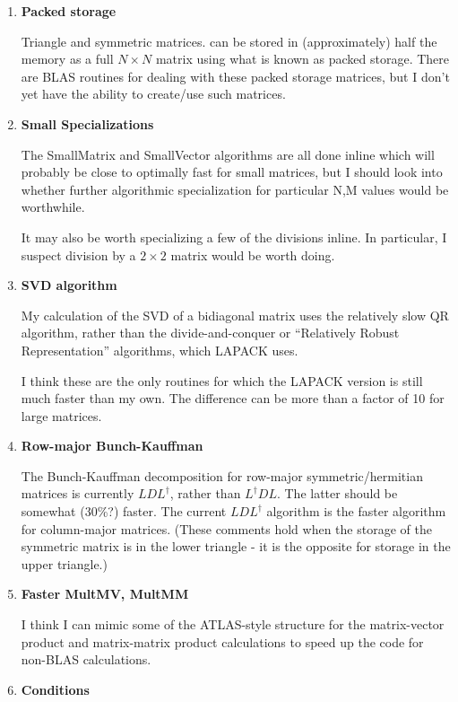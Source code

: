 \documentclass[twoside,letterpaper,11pt]{article}
\begin{document}
\begin{enumerate}
\item
\textbf{Packed storage}

Triangle and symmetric matrices. can be stored in (approximately) half the 
memory as a full $N \times N$ matrix using what is known as packed storage.  
There are BLAS routines for dealing with
these packed storage matrices, but I don't yet have the ability to 
create/use such matrices.

\item
\textbf{Small Specializations}

The SmallMatrix and SmallVector algorithms are all done inline which will
probably be close to optimally fast for small matrices, but I should look into
whether further algorithmic specialization for particular N,M values
would be worthwhile.

It may also be worth specializing a few of the divisions inline.  In particular,
I suspect division by a $2 \times 2$ matrix would be worth doing.

\item
\textbf{SVD algorithm}

My calculation of the 
SVD of a bidiagonal matrix uses the relatively slow QR algorithm,
rather than the divide-and-conquer or ``Relatively Robust Representation''
algorithms, which LAPACK uses.

I think these are the only routines for which the LAPACK version is still much
faster than my own.  The difference can be more than a factor of 10 for large 
matrices.

\item
\textbf{Row-major Bunch-Kauffman}

The Bunch-Kauffman decomposition for row-major symmetric/hermitian
matrices is currently $L D L^\dagger$, rather than $L^\dagger D L$.  
The latter should be somewhat (30\%?) faster.  The current $L D L^\dagger$
algorithm is the faster algorithm for column-major matrices.  
(These comments hold when the storage of the symmetric matrix is in the 
lower triangle - it is the opposite for storage in the upper triangle.)

\item
\textbf{Faster MultMV, MultMM}

I think I can mimic some of the ATLAS-style structure for the 
matrix-vector product and matrix-matrix product calculations 
to speed up the code for non-BLAS calculations.  

\item
\textbf{Conditions}


\end{enumerate}
\end{document}
